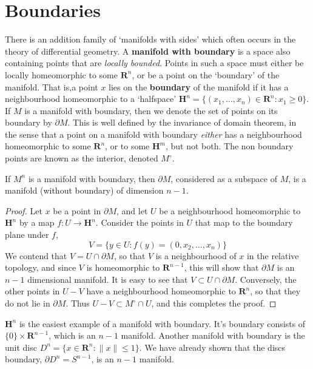\section{Boundaries}

There is an addition family of `manifolds with sides' which often occurs in the theory of differential geometry. A {\bf manifold with boundary} is a space also containing points that are {\it locally bounded}. Points in such a space must either be locally homeomorphic to some $\mathbf{R}^n$, or be a point on the `boundary' of the manifold. That is,a point $x$ lies on the {\bf boundary} of the manifold if it has a neighbourhood homeomorphic to a `halfspace' $\mathbf{H}^n = \{ (x_1, \dots, x_n) \in \mathbf{R}^n: x_1 \geq 0 \}$. If $M$ is a manifold with boundary, then we denote the set of points on its boundary by $\partial M$. This is well defined by the invariance of domain theorem, in the sense that a point on a manifold with boundary {\it either} has a neighbourhood homeomorphic to some $\mathbf{R}^n$, or to some $\mathbf{H}^m$, but not both. The non boundary points are known as the interior, denoted $M^\circ$.

\begin{theorem}
    If $M^n$ is a manifold with boundary, then $\partial M$, considered as a subspace of $M$, is a manifold (without boundary) of dimension $n-1$.
\end{theorem}
\begin{proof}
    Let $x$ be a point in $\partial M$, and let $U$ be a neighbourhood homeomorphic to $\mathbf{H}^n$ by a map $f:U \to \mathbf{H}^n$. Consider the points in $U$ that map to the boundary plane under $f$,
    \[ V = \{ y \in U : f(y) = (0,x_2, \dots, x_n) \} \]
    We contend that $V = U \cap \partial M$, so that $V$ is a neighbourhood of $x$ in the relative topology, and since $V$ is homeomorphic to $\mathbf{R}^{n-1}$, this will show that $\partial M$ is an $n-1$ dimensional manifold. It is easy to see that $V \subset U \cap \partial M$. Conversely, the other points in $U - V$ have a neighbourhood homeomorphic to $\mathbf{R}^n$, so that they do not lie in $\partial M$. Thus $U - V \subset M^\circ \cap U$, and this completes the proof.
\end{proof}

\begin{example}
    $\mathbf{H}^n$ is the easiest example of a manifold with boundary. It's boundary consists of $\{ 0 \} \times \mathbf{R}^{n-1}$, which is an $n - 1$ manifold. Another manifold with boundary is the unit disc $D^n = \{ x \in \mathbf{R}^n : \|x\| \leq 1 \}$. We have already shown that the discs boundary, $\partial D^n = S^{n-1}$, is an $n - 1$ manifold.
\end{example}

